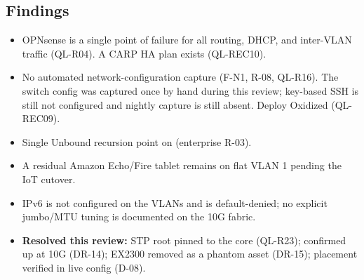 \subsection{Findings}

\begin{itemize}
\item \sevhigh OPNsense is a single point of failure for all routing, DHCP, and
inter-VLAN traffic (QL-R04). A CARP HA plan exists (QL-REC10).
\item \sevmed No automated network-configuration capture (F-N1, R-08, QL-R16). The
switch config was captured once by hand during this review; key-based SSH is still not
configured and nightly capture is still absent. Deploy Oxidized (QL-REC09).
\item \sevmed Single Unbound recursion point on  (enterprise R-03).
\item \sevlow A residual Amazon Echo/Fire tablet remains on flat VLAN 1 pending the IoT
cutover.
\item \sevinfo IPv6 is not configured on the VLANs and is default-denied; no explicit
jumbo/MTU tuning is documented on the 10G fabric.
\item \sevinfo \textbf{Resolved this review:} STP root pinned to the core (QL-R23);
 confirmed up at 10G (DR-14); EX2300 removed as a phantom asset (DR-15);
 placement verified in live config (D-08).
\end{itemize}

